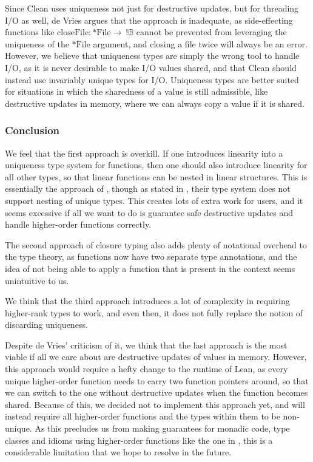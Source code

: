 Since Clean uses uniqueness not just for destructive updates, but for threading I/O as well, de Vries argues that the approach is inadequate, as side-effecting functions like $\mathrm{closeFile} : *\mathrm{File} \to\ !\mathbb{B}$ cannot be prevented from leveraging the uniqueness of the $*\mathrm{File}$ argument, and closing a file twice will always be an error. However, we believe that uniqueness types are simply the wrong tool to handle I/O, as it is never desirable to make I/O values shared, and that Clean should instead use invariably unique types for I/O. Uniqueness types are better suited for situations in which the sharedness of a value is still admissible, like destructive updates in memory, where we can always copy a value if it is shared.

\subsubsection{Conclusion}
We feel that the first approach is overkill. If one introduces linearity into a uniqueness type system for functions, then one should also introduce linearity for all other types, so that linear functions can be nested in linear structures. This is essentially the approach of \cite{sergey_linearity_2022}, though as stated in , their type system does not support nesting of unique types. This creates lots of extra work for users, and it seems excessive if all we want to do is guarantee safe destructive updates and handle higher-order functions correctly.

The second approach of closure typing also adds plenty of notational overhead to the type theory, as functions now have two separate type annotations, and the idea of not being able to apply a function that is present in the context seems unintuitive to us.

We think that the third approach introduces a lot of complexity in requiring higher-rank types to work, and even then, it does not fully replace the notion of discarding uniqueness.

Despite de Vries' criticism of it, we think that the last approach is the most viable if all we care about are destructive updates of values in memory. However, this approach would require a hefty change to the runtime of Lean, as every unique higher-order function needs to carry two function pointers around, so that we can switch to the one without destructive updates when the function becomes shared. Because of this, we decided not to implement this approach yet, and will instead require all higher-order functions and the types within them to be non-unique. As this precludes us from making guarantees for monadic code, type classes and idioms using higher-order functions like the one in , this is a considerable limitation that we hope to resolve in the future.

